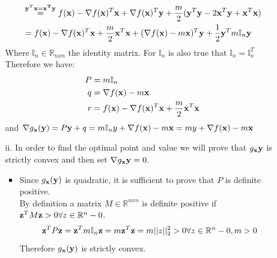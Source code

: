\documentclass[12pt]{article}
\begin{document}
\begin{enumerate}
\begin{enumerate}
\begin{equation}
\begin{split}
				&\overset{{\bf y}^T{\bf x}={\bf x^T}{\bf y}}{=}f({\bf x})-\nabla f({\bf x})^T{\bf x}+\nabla f({\bf x})^T{\bf y}+\frac{m}{2}({\bf y}^T{\bf y}-2{\bf x}^T{\bf y}+{\bf x}^T{\bf x})\\
				&=f({\bf x})-\nabla f({\bf x})^T{\bf x}+\frac{m}{2}{\bf x}^T{\bf x}+(\nabla f({\bf x})-m{\bf x})^T{\bf y}+\frac{1}{2}{\bf y}^Tm\mathbb{I}_n{\bf y}
			\end{split}
		\end{equation}
		Where $\mathbb{I}_n\in \mathbb{R}_{nxn}$ the identity matrix. For $\mathbb{I}_n$ is also true that $\mathbb{I}_n=\mathbb{I}^T_n$\\
		Therefore we have:
		\begin{equation}
			\begin{split}
				P&=m\mathbb{I}_n\\
				q&=\nabla f({\bf x})-m{\bf x}\\
				r&= f({\bf x})-\nabla f({\bf x})^T{\bf x}+\frac{m}{2}{\bf x}^T{\bf x}
			\end{split}
		\end{equation}
		and $\nabla g_{\bf x}({\bf y})=P{\bf y}+q =m\mathbb{I}_n y+\nabla f({\bf x})-m{\bf x} =my+\nabla f({\bf x})-m{\bf x}$
		
		\item [ii.] In order to find the optimal point and value we will prove that $g_{\bf x}{\bf y}$ is strictly convex and then set $\nabla g_{\bf x}{\bf y} = 0$.
		\begin{itemize}
			\item 
			Since $g_{\bf x}({\bf y})$ is quadratic, it is sufficient to prove that $P$ is definite positive.\\
			By definition a matrix $M \in \mathbb{R}^{nxn}$ is definite positive if ${\bf z}^TM{\bf z}>0\forall z\in\mathbb{R}^n-{0}$.
			\begin{equation}
				{\bf z}^TP{\bf z}={\bf z}^Tm\mathbb{I}_n {\bf z}=m{\bf z}^T{\bf z} = m||z||_2^2>0\forall z\in\mathbb{R}^n-{0},m>0
			\end{equation}
			Therefore $g_{\bf x}({\bf y})$ is strictly convex.
			

\end{itemize}
\end{enumerate}
\end{enumerate}
\end{document}
